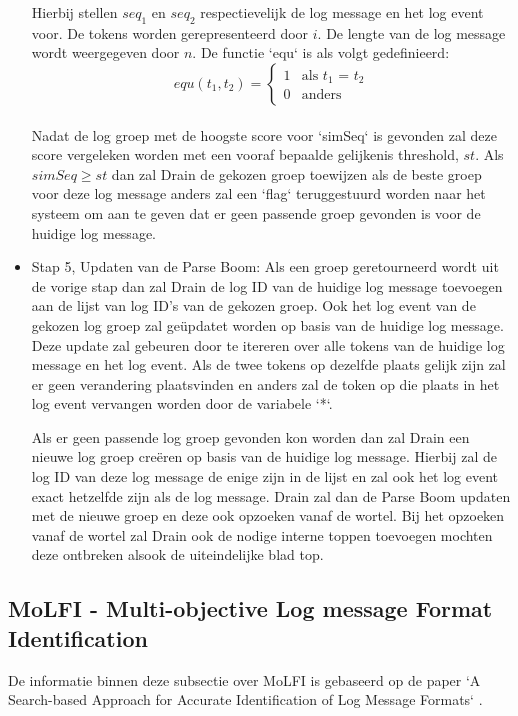 \begin{itemize}
    Hierbij stellen \(seq_{1}\) en \(seq_{2}\) respectievelijk de log message en het log event voor. De tokens worden gerepresenteerd door $i$. De lengte van de log message wordt weergegeven door $n$. De functie `equ` is als volgt gedefinieerd:\\
    \[equ(t_{1}, t_{2}) = \begin{cases}
                            1 & \text{als \(t_{1}\) = \(t_{2}\)}\\
                            0 & \text{anders}
                          \end{cases}\]  \\
    Nadat de log groep met de hoogste score voor `simSeq` is gevonden zal deze score vergeleken worden met een vooraf bepaalde gelijkenis threshold, $st$. Als \(simSeq \geq st\) dan zal Drain de gekozen groep toewijzen als de beste groep voor deze log message anders zal een `flag` teruggestuurd worden naar het systeem om aan te geven dat er geen passende groep gevonden is voor de huidige log message. \\
    \item Stap 5, Updaten van de Parse Boom:
    Als een groep geretourneerd wordt uit de vorige stap dan zal Drain de log ID van de huidige log message toevoegen aan de lijst van log ID's van de gekozen groep. Ook het log event van de gekozen log groep zal geüpdatet worden op basis van de huidige log message. Deze update zal gebeuren door te itereren over alle tokens van de huidige log message en het log event. Als de twee tokens op dezelfde plaats gelijk zijn zal er geen verandering plaatsvinden en anders zal de token op die plaats in het log event vervangen worden door de variabele `*`. 
    
    Als er geen passende log groep gevonden kon worden dan zal Drain een nieuwe log groep creëren op basis van de huidige log message. Hierbij zal de log ID van deze log message de enige zijn in de lijst en zal ook het log event exact hetzelfde zijn als de log message. Drain zal dan de Parse Boom updaten met de nieuwe groep en deze ook opzoeken vanaf de wortel. Bij het opzoeken vanaf de wortel zal Drain ook de nodige interne toppen toevoegen mochten deze ontbreken alsook de uiteindelijke blad top.
\end{itemize}

\subsection{MoLFI - Multi-objective Log message Format Identification}
De informatie binnen deze subsectie over MoLFI is gebaseerd op de paper `A Search-based Approach for Accurate Identification of Log Message Formats` \autocite{messaoudi2018search}. 

